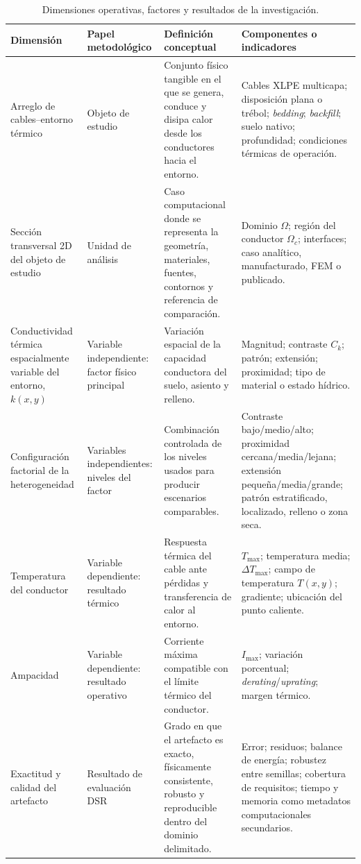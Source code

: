 \documentclass[11pt,a4paper,oneside]{report}
\renewcommand{\arraystretch}{1.18}
\newcommand{\Tmax}{T_{\max}}
\newcommand{\Imax}{I_{\max}}
\newcommand{\kx}{k(x,y)}
\begin{document}
\begin{table}[H]
\centering
\caption{Dimensiones operativas, factores y resultados de la investigación.}
\label{tab:dimensiones-operativas}
\begingroup
\scriptsize
\setlength{\tabcolsep}{3pt}
\renewcommand{\arraystretch}{1.42}
\begin{tabularx}{\textwidth}{L{3.0cm}L{2.75cm}Y Y}
\toprule
\textbf{Dimensión} & \textbf{Papel metodológico} & \textbf{Definición conceptual} & \textbf{Componentes o indicadores} \\
\midrule
Arreglo de cables--entorno térmico & Objeto de estudio & Conjunto físico tangible en el que se genera, conduce y disipa calor desde los conductores hacia el entorno. & Cables XLPE multicapa; disposición plana o trébol; \textit{bedding}; \textit{backfill}; suelo nativo; profundidad; condiciones térmicas de operación. \\
Sección transversal 2D del objeto de estudio & Unidad de análisis & Caso computacional donde se representa la geometría, materiales, fuentes, contornos y referencia de comparación. & Dominio $\Omega$; región del conductor $\Omega_c$; interfaces; caso analítico, manufacturado, FEM o publicado. \\
Conductividad térmica espacialmente variable del entorno, $\kx$ & Variable independiente: factor físico principal & Variación espacial de la capacidad conductora del suelo, asiento y relleno. & Magnitud; contraste $C_k$; patrón; extensión; proximidad; tipo de material o estado hídrico. \\
Configuración factorial de la heterogeneidad & Variables independientes: niveles del factor & Combinación controlada de los niveles usados para producir escenarios comparables. & Contraste bajo/medio/alto; proximidad cercana/media/lejana; extensión pequeña/media/grande; patrón estratificado, localizado, relleno o zona seca. \\
Temperatura del conductor & Variable dependiente: resultado térmico & Respuesta térmica del cable ante pérdidas y transferencia de calor al entorno. & $\Tmax$; temperatura media; $\Delta\Tmax$; campo de temperatura $T(x,y)$; gradiente; ubicación del punto caliente. \\
Ampacidad & Variable dependiente: resultado operativo & Corriente máxima compatible con el límite térmico del conductor. & $\Imax$; variación porcentual; \textit{derating}/\textit{uprating}; margen térmico. \\
Exactitud y calidad del artefacto & Resultado de evaluación DSR & Grado en que el artefacto es exacto, físicamente consistente, robusto y reproducible dentro del dominio delimitado. & Error; residuos; balance de energía; robustez entre semillas; cobertura de requisitos; tiempo y memoria como metadatos computacionales secundarios. \\

\end{tabularx}
\end{table}
\end{document}
